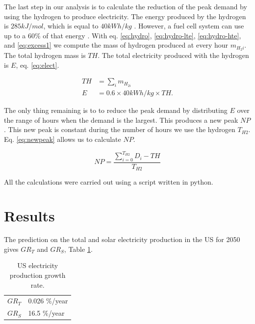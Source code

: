\documentclass{anstrans}
\begin{document}
The last step in our analysis is to calculate the reduction of the peak demand by using the hydrogen to produce electricity.
The energy produced by the hydrogen is $285 kJ/mol$, which is equal to $40 kWh/kg$ \cite{ursua_hydrogen_2012}.
However, a fuel cell system can use up to a 60$\%$ of that energy \cite{doe_energy_efficiency_and_renewable_energy_fuel_2015}.
With eq. \ref{eq:hydro}, \ref{eq:hydro-lte}, \ref{eq:hydro-hte}, and \ref{eq:excess1} we compute the mass of hydrogen produced at every hour $m_{H_2i}$.
The total hydrogen mass is $TH$.
The total electricity produced with the hydrogen is $E$, eq. \ref{eq:elect}.

\begin{equation}
\begin{split}
TH &= \sum_i m_{H_{2i}}
\\
E &= 0.6 \times 40 kWh/kg \times TH.
\end{split}
\label{eq:elect}
\end{equation}

The only thing remaining is to to reduce the peak demand by distributing $E$ over the range of hours when the demand is the largest. This produces a new peak $NP$. This new peak is constant during the number of hours we use the hydrogen $T_{H2}$. Eq. \ref{eq:newpeak} allows us to calculate $NP$.

\begin{equation}
NP = \frac{\sum_{i=0}^{T_{H2}} D_i - TH}{T_{H2}}
\label{eq:newpeak}
\end{equation}

All the calculations were carried out using a script written in python.

\section{Results}
\label{results}

The prediction on the total and solar electricity production in the \gls{US} for 2050 gives $GR_T$ and $GR_S$, Table \ref{tab:grate}.

\begin{table}[htbp!]
    \begin{tabular}{|l|l|}
        \hline
        $GR_T$ & 0.026 $\%$/year \\
        $GR_S$ & 16.5 $\%$/year \\ \hline
    \end{tabular}
    \caption{\gls{US} electricity production growth rate.}
    \label{tab:grate}
\end{table}
\end{document}
